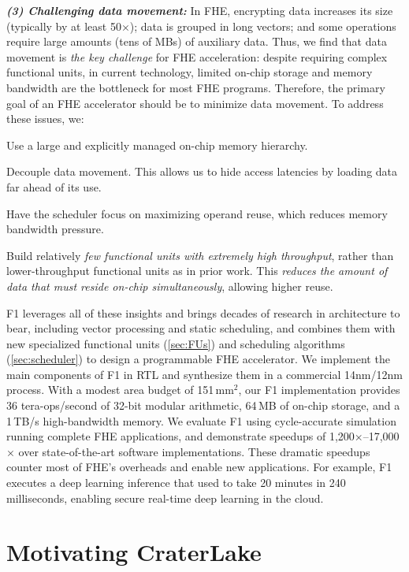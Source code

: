 \noindent \textbf{\emph{(3) Challenging data movement:}}
In FHE, encrypting data increases its size (typically by at least 50$\times$);
data is grouped in long vectors; and some operations require large amounts
(tens of MBs) of auxiliary data. Thus, we find that data movement is \emph{the
key challenge} for FHE acceleration: despite requiring complex functional
units, in current technology, limited on-chip storage and memory bandwidth are
the bottleneck for most FHE programs. Therefore, the primary goal of an FHE
accelerator should be to
minimize data movement. To address these issues, we:
\begin{compactenum}
\item Use a large and explicitly managed on-chip memory hierarchy.
\item Decouple data movement. This allows us to hide access latencies by
    loading data far ahead of its use.
\item Have the scheduler focus on maximizing operand reuse, which reduces
    memory bandwidth pressure.
\item Build relatively \emph{few functional units with extremely high
    throughput}, rather than lower-throughput functional units as in prior
    work. This \emph{reduces the amount of data that must reside on-chip
    simultaneously}, allowing higher reuse.
\end{compactenum}

F1 leverages all of these insights and brings decades of research in
architecture to bear, including vector processing and static scheduling, and
combines them with new specialized functional units (\autoref{sec:FUs}) and
scheduling algorithms (\autoref{sec:scheduler}) to design a programmable FHE
accelerator. We implement the main components of F1 in RTL and synthesize them
in a commercial 14nm/12nm process. With a modest area budget of 151\,mm$^2$,
our F1 implementation provides 36 tera-ops/second of 32-bit modular arithmetic,
64\,MB of on-chip storage, and a 1\,TB/s high-bandwidth memory. We evaluate F1
using cycle-accurate simulation running complete FHE applications, and
demonstrate speedups of 1,200$\times$--17,000$\times$ over state-of-the-art
software implementations. These dramatic speedups counter most of FHE's
overheads and enable new applications. For example, F1 executes a deep learning
inference that used to take 20 minutes in 240 milliseconds, enabling secure
real-time deep learning in the cloud.

\section{Motivating CraterLake}

